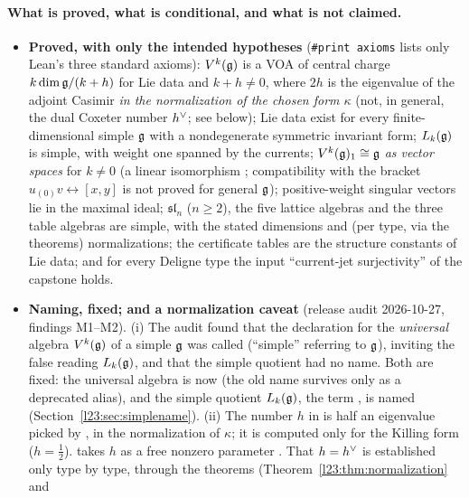 \paragraph{What is proved, what is conditional, and what is not claimed.}
\begin{itemize}
\item \textbf{Proved, with only the intended hypotheses} (\texttt{\#print axioms} lists only Lean's three standard axioms):
  $V^k(\mathfrak g)$ is a VOA of central charge $k\dim\mathfrak g/(k+h)$ for Lie data and $k+h\ne0$, where $2h$ is the eigenvalue of the
  adjoint Casimir \emph{in the normalization of the chosen form $\kappa$} (not, in general, the dual Coxeter number $h^\vee$; see
  below); Lie data exist for every
  finite-dimensional simple $\mathfrak g$ with a nondegenerate symmetric invariant form; $L_k(\mathfrak g)$ is simple, with weight
  one spanned by the currents; $V^k(\mathfrak g)_1\cong\mathfrak g$ \emph{as vector spaces} for $k\ne0$ (a linear isomorphism
  ; compatibility with the bracket $u_{(0)}v\leftrightarrow[x,y]$ is not proved for general $\mathfrak g$);
  positive-weight singular vectors lie in the
  maximal ideal; $\mathfrak{sl}_n$ ($n\ge2$), the five lattice algebras and the three table algebras are simple, with the
  stated dimensions and (per type, via the  theorems) normalizations; the certificate tables are the structure constants of Lie data; and for every
  Deligne type the input ``current-jet surjectivity'' of the capstone holds.
\item \textbf{Naming, fixed; and a normalization caveat} (release audit 2026-10-27, findings M1--M2). (i) The audit found that the
  declaration for the \emph{universal} algebra $V^k(\mathfrak g)$ of a simple $\mathfrak g$ was called  (``simple''
  referring to $\mathfrak g$), inviting the false reading $L_k(\mathfrak g)$, and that the simple quotient had no name. Both are fixed: the
  universal algebra is now  (the old name survives only as a deprecated alias), and the simple quotient
  $L_k(\mathfrak g)$, the term , is named 
  (Section~\ref{l23:sec:simplename}). (ii) The number $h$ in
   is half an eigenvalue picked by , in the normalization of $\kappa$; it is computed only
  for the Killing form ($h=\frac12$).  takes $h$ as a free nonzero parameter . That $h=h^\vee$ is
  established only type by type, through the  theorems (Theorem~\ref{l23:thm:normalization} and

\end{itemize}
